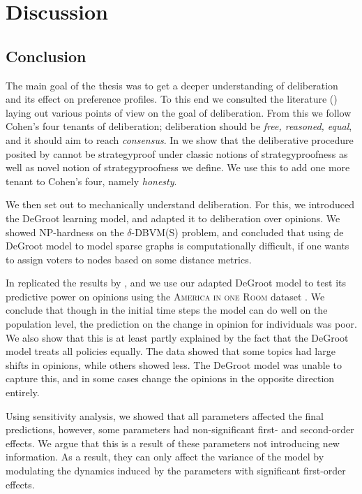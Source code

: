 \newpage
\chapter{Discussion}
\label{Discussion}

\section{Conclusion}

The main goal of the thesis was to get a deeper understanding of deliberation
and its effect on preference profiles. To this end we consulted the literature
() laying out various points of view on the goal of
deliberation. From this we follow Cohen's
\cite{cohenDeliberationDemocraticLegimitimacy2002} four tenants of
deliberation; deliberation should be \textit{free, reasoned, equal}, and  it
should aim to reach \textit{consensus}. In  we show that the
deliberative procedure posited by
\citet{radDeliberationSinglePeakednessCoherent2021} cannot be strategyproof
under classic notions of strategyproofness as well as novel notion of
strategyproofness we define. We use this to add one more tenant to Cohen's four,
namely \textit{honesty}.

We then set out to mechanically understand deliberation. For this, we introduced
the DeGroot learning model, and adapted it to deliberation over opinions. We showed
NP-hardness on the $\delta$-DBVM(S) problem, and concluded that using de DeGroot model
to model sparse graphs is computationally difficult, if one wants to assign voters to nodes
based on some distance metrics.

In  replicated the results by
\citet{radDeliberationSinglePeakednessCoherent2021}, and we use our adapted
DeGroot model to test its predictive power on opinions using the \textsc{America
in one Room} dataset \cite{fishkinCanDeliberationHave2024}. We conclude that
though in the initial time steps the model can do well on the population level,
the prediction on the change in opinion for individuals was poor. We also show
that this is at least partly explained by the fact that the DeGroot model treats
all policies equally. The data showed that some topics had large shifts in
opinions, while others showed less. The DeGroot model was unable to capture
this, and in some cases change the opinions in the opposite direction entirely.

Using sensitivity analysis, we showed that all parameters affected the final
predictions, however, some parameters had non-significant first- and second-order
effects. We argue that this is a result of these parameters not introducing new
information. As a result, they can only affect the variance of the model by
modulating the dynamics induced by the parameters with significant first-order
effects.

